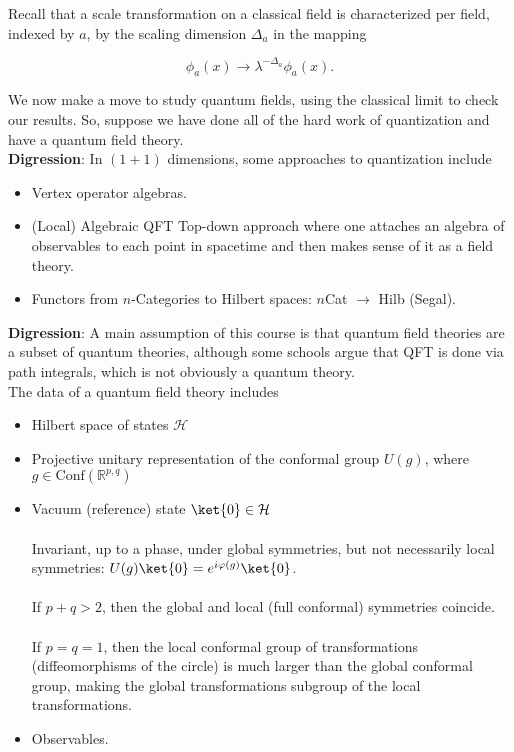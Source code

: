
\noindent Recall that a scale transformation on a classical field is characterized per field, indexed by $a$, by the scaling dimension $\Delta_a$ in the mapping

\begin{equation}
\phi_a (x) \rightarrow \lambda^{-\Delta_a} \phi_a (x).
\end{equation}

\noindent We now make a move to study quantum fields, using the classical limit to check our results. So, suppose we have done all of the hard work of quantization and have a quantum field theory. \\

\noindent \textbf{Digression}: In $(1+1)$ dimensions, some approaches to quantization include

\begin{itemize}
\item Vertex operator algebras.
\item (Local) Algebraic QFT
	\subitem Top-down approach where one attaches an algebra of observables to each point in spacetime and then makes sense of it as a field theory.
\item Functors from $n$-Categories to Hilbert spaces: $n$Cat $\rightarrow$ Hilb (Segal).
\end{itemize}

\noindent  \textbf{Digression}: A main assumption of this course is that quantum field theories are a subset of quantum theories, although some schools argue that QFT is done via path integrals, which is not obviously a quantum theory. \\

\noindent The data of a quantum field theory includes

\begin{itemize}
\item Hilbert space of states $\mathcal{H}$
\item Projective unitary representation of the conformal group $U(g)$, where $g \in \text{Conf}(\mathbb{R}^{p,q})$
\item Vacuum (reference) state $\ket{0} \in \mathcal{H}$ \\
	\\ Invariant, up to a phase, under global symmetries, but not necessarily local symmetries: $U(g) \ket{0} = e^{i \varphi (g)} \ket{0}$. \\
	\\ If $p+q > 2$, then the global and local (full conformal) symmetries coincide. \\
	\\ If $p=q=1$, then the local conformal group of transformations (diffeomorphisms of the circle) is much larger than the global conformal group, making the global transformations subgroup of the local transformations. \\
\item Observables.
\end{itemize}

